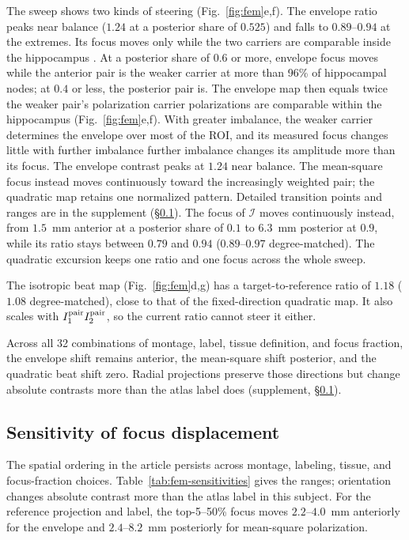 \documentclass[11pt,a4paper]{article}
\newif\ifjne
\providecommand{\DIFaddtex}[1]{{\protect\color{blue} \sf #1}} %
\providecommand{\DIFdeltex}[1]{{\protect\color{red} \scriptsize #1}} %
\providecommand{\DIFaddbegin}{} %
\providecommand{\DIFaddend}{} %
\providecommand{\DIFdelbegin}{} %
\providecommand{\DIFdelend}{} %
\providecommand{\DIFadd}[1]{\texorpdfstring{\DIFaddtex{#1}}{#1}} %
\providecommand{\DIFdel}[1]{\texorpdfstring{\DIFdeltex{#1}}{}} %
\begin{document}
The \DIFdelbegin \DIFdel{sweep shows two kinds of steering (Fig.~\ref{fig:fem}e,f). The envelope ratio peaks
near balance ($1.24$ at a posterior share of $0.525$) and falls to $0.89$--$0.94$ at
the extremes. Its focus moves only while the two carriers are comparable
inside the hippocampus . At a posterior share of $0.6$ or more,}\DIFdelend \DIFaddbegin \DIFadd{envelope focus moves while }\DIFaddend the \DIFdelbegin \DIFdel{anterior pair is the weaker carrier at more than 96\% of hippocampal nodes; at $0.4$ or less, the posterior pair is. The
envelope map then equals twice the weaker pair's polarization }\DIFdelend \DIFaddbegin \DIFadd{carrier polarizations are comparable
within the hippocampus (Fig.~\ref{fig:fem}e,f). With greater imbalance,
the weaker carrier determines the envelope }\DIFaddend over most of the ROI, and
\DIFdelbegin \DIFdel{its measured focus changes little with further imbalance }\DIFdelend \DIFaddbegin \DIFadd{further imbalance changes its amplitude more than its focus. The envelope
contrast peaks at $1.24$ near balance. The mean-square focus instead moves
continuously toward the increasingly weighted pair; the quadratic map
retains one normalized pattern. Detailed transition points and ranges are
in the supplement (\S\ref{supp:fem-sensitivities})}\DIFaddend .
\DIFdelbegin \DIFdel{The focus of $\mathcal I$ moves
continuously instead, from $1.5$~mm anterior at a posterior share of $0.1$ to $6.3$~mm
posterior at $0.9$, while its ratio stays between $0.79$ and $0.94$ ($0.89$--$0.97$
degree-matched). The quadratic excursion keeps one ratio and one focus across the whole sweep.
}\DIFdelend

The isotropic beat map (Fig.~\ref{fig:fem}d,g) has a target-to-reference ratio of $1.18$
($1.08$ degree-matched), close to that of the fixed-direction quadratic map. It also
scales with $I_1^{\rm pair}I_2^{\rm pair}$, so the current ratio cannot steer it either.

Across all 32 combinations of montage, label, tissue definition, and focus
fraction, the envelope shift remains anterior, the mean-square shift posterior,
and the quadratic beat shift zero. Radial projections preserve those directions
but change absolute contrasts more than the atlas label does (supplement,
\S\ref{supp:fem-sensitivities}).
\ifjne\else
\subsection{Sensitivity of focus displacement}\label{supp:fem-sensitivities}
The spatial ordering in the article persists across montage, labeling, tissue,
and focus-fraction choices. Table~\ref{tab:fem-sensitivities} gives the ranges;
orientation changes absolute contrast more than the atlas label in this subject.
For the reference projection and label, the top-5--50\% focus moves
$2.2$--$4.0$~mm anteriorly for the envelope and $2.4$--$8.2$~mm posteriorly
for mean-square polarization.
\end{document}
